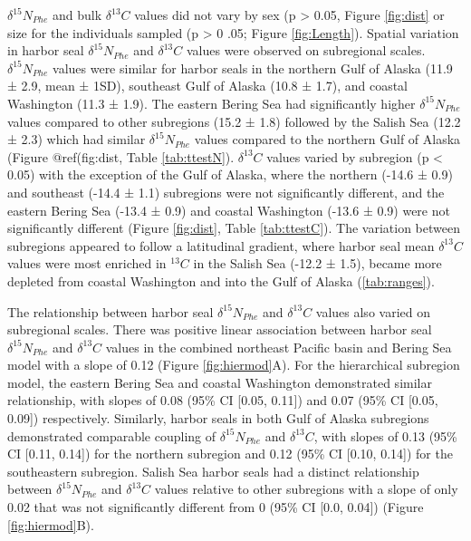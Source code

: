 \documentclass [11pt, proquest] {uwthesis}[2015/03/03]
\begin{document}
\(\delta^{15}N_{Phe}\) and bulk \(\delta^{13}C\) values did not vary by
sex (p \textgreater{} 0.05, Figure \ref{fig:dist} or size for the
individuals sampled (p \textgreater{} 0 .05; Figure \ref{fig:Length}).
Spatial variation in harbor seal \(\delta^{15}N_{Phe}\) and
\(\delta^{13}C\) values were observed on subregional scales.
\(\delta^{15}N_{Phe}\) values were similar for harbor seals in the
northern Gulf of Alaska (11.9 ± 2.9, mean ± 1SD), southeast Gulf of
Alaska (10.8 ± 1.7), and coastal Washington (11.3 ± 1.9). The eastern
Bering Sea had significantly higher \(\delta^{15}N_{Phe}\) values
compared to other subregions (15.2 ± 1.8) followed by the Salish Sea
(12.2 ± 2.3) which had similar \(\delta^{15}N_{Phe}\) values compared to
the northern Gulf of Alaska (Figure @ref(fig:dist, Table
\ref{tab:ttestN}). \(\delta^{13}C\) values varied by subregion (p
\textless{} 0.05) with the exception of the Gulf of Alaska, where the
northern (-14.6 ± 0.9) and southeast (-14.4 ± 1.1) subregions were not
significantly different, and the eastern Bering Sea (-13.4 ± 0.9) and
coastal Washington (-13.6 ± 0.9) were not significantly different
(Figure \ref{fig:dist}, Table \ref{tab:ttestC}). The variation between
subregions appeared to follow a latitudinal gradient, where harbor seal
mean \(\delta^{13}C\) values were most enriched in \(^{13}C\) in the
Salish Sea (-12.2 ± 1.5), became more depleted from coastal Washington
and into the Gulf of Alaska (\ref{tab:ranges}).

The relationship between harbor seal \(\delta^{15}N_{Phe}\) and
\(\delta^{13}C\) values also varied on subregional scales. There was
positive linear association between harbor seal \(\delta^{15}N_{Phe}\)
and \(\delta^{13}C\) values in the combined northeast Pacific basin and
Bering Sea model with a slope of 0.12 (Figure \ref{fig:hiermod}A). For
the hierarchical subregion model, the eastern Bering Sea and coastal
Washington demonstrated similar relationship, with slopes of 0.08 (95\%
CI {[}0.05, 0.11{]}) and 0.07 (95\% CI {[}0.05, 0.09{]}) respectively.
Similarly, harbor seals in both Gulf of Alaska subregions demonstrated
comparable coupling of \(\delta^{15}N_{Phe}\) and \(\delta^{13}C\), with
slopes of 0.13 (95\% CI {[}0.11, 0.14{]}) for the northern subregion and
0.12 (95\% CI {[}0.10, 0.14{]}) for the southeastern subregion. Salish
Sea harbor seals had a distinct relationship between
\(\delta^{15}N_{Phe}\) and \(\delta^{13}C\) values relative to other
subregions with a slope of only 0.02 that was not significantly
different from 0 (95\% CI {[}0.0, 0.04{]}) (Figure \ref{fig:hiermod}B).
\end{document}
